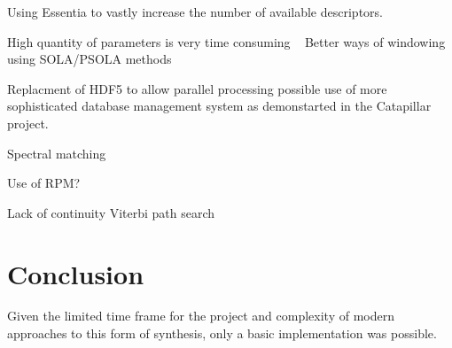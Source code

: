 \documentclass{scrartcl}
\begin{document}
    Using Essentia to vastly increase the number of available descriptors.

    High quantity of parameters is very time consuming ~\parencite{Petrushin2007} 
    Better ways of windowing using SOLA/PSOLA methods

    Replacment of HDF5 to allow parallel processing 
    possible use of more sophisticated database management system as demonstarted in the Catapillar project.

    Spectral matching~\parencite{Hoffman2009} 

    Use of RPM?~\parencite[p.82]{Lindemann2007}

    Lack of continuity
    Viterbi path search~\parencite[p.1]{Schwarz2006a}

    \section*{Conclusion}
    Given the limited time frame for the project and complexity of modern
    approaches to this form of synthesis, only a basic implementation was
    possible.

    \printbibliography
\end{document}
